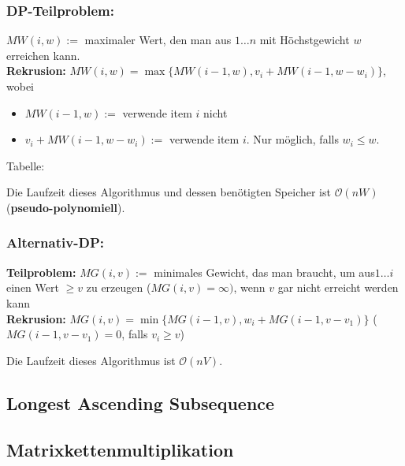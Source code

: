 \documentclass[a4paper]{article}
\begin{document}
\subsubsection*{DP-Teilproblem:} $MW(i, w) :=$ maximaler Wert, den man aus $1 \dots n$ mit Höchstgewicht $w$ erreichen kann. \\
\textbf{Rekrusion:} $MW(i,w) = \max \lbrace MW(i-1, w) , v_i + MW(i-1,w-w_i)\rbrace$, wobei 
\begin{itemize}
    \item $MW(i-1, w) :=$ verwende item $i$ nicht
    \item $v_i + MW(i-1,w-w_i) :=$ verwende item $i$. Nur möglich, falls $w_i \leq w$.
\end{itemize}
Tabelle:



Die Laufzeit dieses Algorithmus und dessen benötigten Speicher ist $\mathcal{O}(nW)$ (\textbf{pseudo-polynomiell}).

\subsubsection*{Alternativ-DP:} 
\textbf{Teilproblem:} $MG(i, v) :=$ minimales Gewicht, das man braucht, um aus$1 \dots i$ einen Wert $\geq v$ zu erzeugen ($MG(i, v) = \infty)$, wenn $v$ gar nicht erreicht werden kann \\
\textbf{Rekrusion:} $MG(i,v)= \min\lbrace MG(i-1, v), w_i + MG(i-1, v-v_1)\rbrace$ ($MG(i-1, v-v_1) = 0$, falls $v_i \geq v$)






Die Laufzeit dieses Algorithmus ist $\mathcal{O}(nV)$.


\subsection{Longest Ascending Subsequence}

\subsection{Matrixkettenmultiplikation}



\newpage
\end{document}
